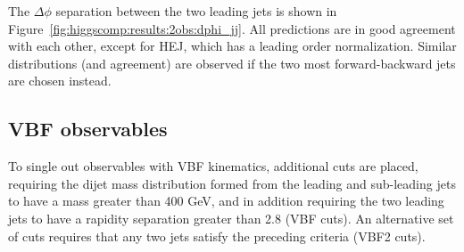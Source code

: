 The $\Delta\phi$ separation between the two leading jets is shown in
Figure~\ref{fig:higgscomp:results:2obs:dphi_jj}. All predictions are
in good agreement with each other, except for HEJ, which has a leading
order normalization. Similar distributions (and agreement) are
observed if the two most forward-backward jets are chosen instead.



\clearpage
\subsection{VBF observables}
\label{sec:hjetscomp:results:VBFobs}

To single out observables with VBF kinematics, additional cuts are
placed, requiring the dijet mass distribution formed from the leading
and sub-leading jets to have a mass greater than 400 GeV, and in
addition requiring the two leading jets to have a rapidity separation
greater than 2.8 (VBF cuts). An alternative set of cuts requires that
any two jets satisfy the preceding criteria (VBF2 cuts).

